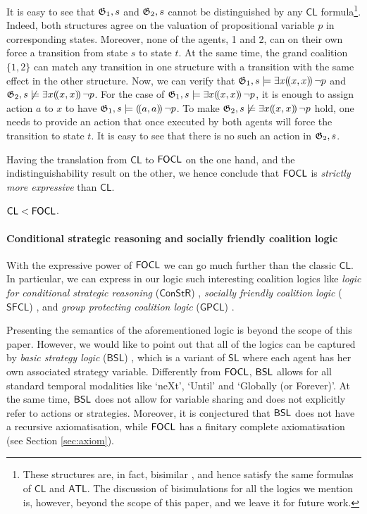 \documentclass[sigconf,anonymous]{aamas}
\begin{document}
It is easy to see that $\mathfrak{G}_1,s$ and $\mathfrak{G}_2,s$ cannot be distinguished by any $\mathsf{CL}$ formula\footnote{These structures are, in fact, bisimilar \cite{agotnes07}, and hence satisfy the same formulas of $\mathsf{CL}$ and $\mathsf{ATL}$. The discussion of bisimulations for all the logics we mention is, however, beyond the scope of this paper, and we leave it for future work.}. Indeed, both structures agree on the valuation of propositional variable $p$ in corresponding states. Moreover, none of the agents, 1 and 2, can on their own force a transition from state $s$ to state $t$. At the same time, the grand coalition $\{1,2\}$ can match any transition in one structure with a transition with the same effect in the other structure. %
Now, we can verify that $\mathfrak{G}_1,s \models \exists x (\!( x, x )\!)\, \lnot p$ and $\mathfrak{G}_2,s \not \models \exists x (\!( x, x )\!)\, \lnot p$. For the case of  $\mathfrak{G}_1,s \models \exists x (\!( x, x )\!)\, \lnot p$, it is enough to assign action $a$ to $x$ to have $\mathfrak{G}_1,s \models (\!( a, a )\!)\, \lnot p$. To make $\mathfrak{G}_2,s \not \models \exists x (\!( x, x )\!)\, \lnot p$ hold, one needs to provide an action that once executed by both agents will force the transition to state $t$. It is easy to see that there is no such an action in $\mathfrak{G}_2,s$.

Having the translation from $\mathsf{CL}$ to $\mathsf{FOCL}$ on the one hand, and the indistinguishability result on the other, we hence conclude that $\mathsf{FOCL}$ is \textit{strictly more expressive} than $\mathsf{CL}$.

\begin{proposition}
\label{prop:cslVScl}
    $\mathsf{CL} < \mathsf{FOCL}$.
\end{proposition}

\paragraph{Conditional strategic reasoning and socially friendly coalition logic} With the expressive power of $\mathsf{FOCL}$ we can go much further than the classic $\mathsf{CL}$. In particular, we can express in our logic such interesting coalition logics like \textit{logic for conditional strategic reasoning} ($\mathsf{ConStR}$) \cite{goranko22}, \textit{socially friendly coalition logic} ($\mathsf{SFCL}$) \cite{goranko18}, and \textit{group protecting coalition logic} ($\mathsf{GPCL}$)  \cite{goranko18}. 

Presenting the semantics of the aforementioned logic is beyond the scope of this paper. However, we would like to point out that all of the logics can be captured by \textit{basic strategy logic} ($\mathsf{BSL}$) \cite{goranko23}, which is a variant of $\mathsf{SL}$ where each agent has her own associated strategy variable. Differently from $\mathsf{FOCL}$, $\mathsf{BSL}$ allows for all standard temporal modalities like `ne\textsf{X}t', `\textsf{U}ntil' and `\textsf{G}lobally (or Forever)'. At the same time, $\mathsf{BSL}$ does not allow for variable sharing and does not explicitly refer to actions or strategies. Moreover, it is conjectured \cite{goranko23} that $\mathsf{BSL}$ does not have a recursive axiomatisation, while $\mathsf{FOCL}$ has a finitary complete axiomatisation (see Section \ref{sec:axiom}).
\end{document}
